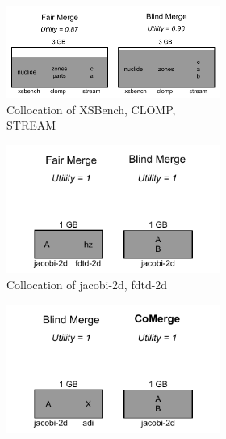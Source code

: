 \begin{figure}
\begin{subfigure}{\linewidth}
  \begin{subfigure}{0.425\linewidth}
  	\includegraphics[width=\linewidth]{figures/tiering2a.pdf}
      \captionsetup{labelformat=empty}
  	\caption{Collocation of XSBench, CLOMP, STREAM}
  \end{subfigure}%
     \begin{subfigure}{0.3\linewidth}
  \includegraphics[width=\linewidth]{figures/tiering2b.pdf}
      \captionsetup{labelformat=empty}
    \caption{Collocation of jacobi-2d, fdtd-2d}
    \end{subfigure}%
     \begin{subfigure}{0.3\linewidth}
     \centering
  \includegraphics[width=\linewidth]{figures/tiering2c.pdf}

\end{subfigure}
\end{subfigure}
\end{figure}

